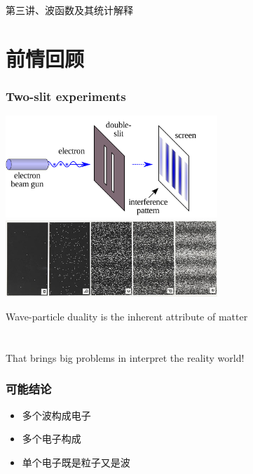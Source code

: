 \begin{frame}
    \frametitle{}
    \begin{center}
    { {\huge 第三讲、波函数及其统计解释}}
    \end{center}    
\end{frame}

\section{前情回顾}

\begin{frame}
    \frametitle{Two-slit experiments}
    \begin{center}
        \includegraphics[width=0.6\textwidth]{figs/Etwoslitexp.png} \\
        \includegraphics[width=0.6\textwidth]{figs/two-slit.png} \\
    \end{center} 
\end{frame}

\begin{frame}
    \begin{center}
        Wave-particle duality is the inherent attribute of matter \\
        ~~\\
        ~~\\
        That brings big problems in interpret the reality world! \\
    \end{center} 
\end{frame}

\begin{frame}
    \frametitle{可能结论}
    \begin{itemize}
        \item 多个波构成电子 
        \item 多个电子构成 
        \item 单个电子既是粒子又是波 
    \end{itemize}
\end{frame}

